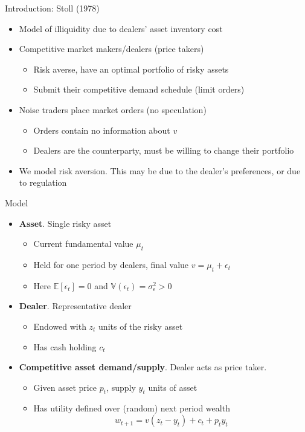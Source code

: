 \documentclass[english,10pt]{beamer}
\begin{document}
\begin{frame}{Introduction: Stoll (1978)}
	\begin{itemize}
		\item Model of illiquidity due to dealers' asset inventory cost
		\item Competitive market makers/dealers (price takers)
		\begin{itemize}
			\item Risk averse, have an optimal portfolio of risky assets
			\item Submit their competitive demand schedule (limit orders)
		\end{itemize}
		\item Noise traders place market orders (no speculation)
		\begin{itemize}
			\item Orders contain no information about $v$
			\item Dealers are the counterparty, must be willing to change their portfolio
		\end{itemize}
		\item We model risk aversion. This may be due to the dealer's preferences, or due to regulation
	\end{itemize}
\end{frame}


\begin{frame}{Model}
	\begin{itemize}
		\item \textbf{Asset}. Single risky asset
		\begin{itemize}
			\item Current fundamental value $\mu_t$
			\item Held for one period by dealers, final value $v=\mu_t + \epsilon_t$
			\item Here $\mathbb{E}[\epsilon_t] = 0$ and $\mathbb{V}(\epsilon_{t})=\sigma^2_\epsilon > 0$
		\end{itemize}
		\item \textbf{Dealer}. Representative dealer
		\begin{itemize}
			\item Endowed with $z_t$ units of the risky asset
			\item Has cash holding $c_t$
		\end{itemize}
		\item \textbf{Competitive asset demand/supply}. Dealer acts as price taker.
		\begin{itemize}
			\item Given asset price $p_t$, supply $y_t$ units of asset
			\item Has utility defined over (random) next period wealth
			\[
			w_{t+1} = v(z_t - y_t) + c_t + p_t y_t
			\]
		\end{itemize}
	\end{itemize}
\end{frame}
\end{document}

